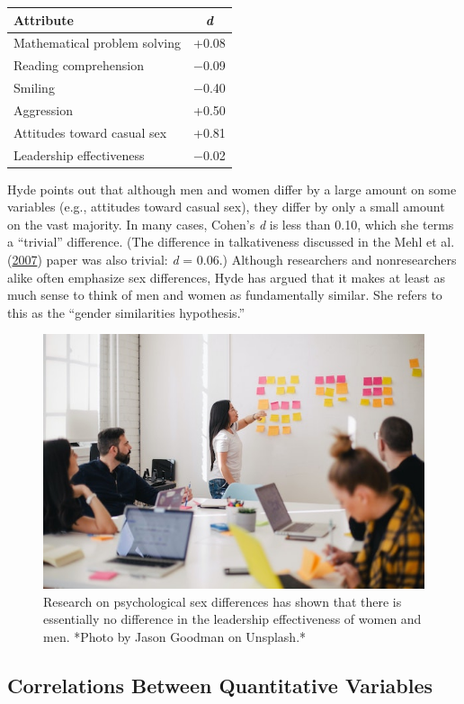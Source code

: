 \documentclass[
]{krantz}
\begin{document}
\begin{longtable}[]{@{}lc@{}}
\toprule()
Attribute & \emph{d} \\
\midrule()
\endhead
Mathematical problem solving & +0.08 \\
Reading comprehension & −0.09 \\
Smiling & −0.40 \\
Aggression & +0.50 \\
Attitudes toward casual sex & +0.81 \\
Leadership effectiveness & −0.02 \\
\bottomrule()
\end{longtable}

Hyde points out that although men and women differ by a large amount on some variables (e.g., attitudes toward casual sex), they differ by only a small amount on the vast majority. In many cases, Cohen's \emph{d} is less than 0.10, which she terms a ``trivial'' difference. (The difference in talkativeness discussed in the Mehl et al. (\protect\hyperlink{ref-mehl2007women}{2007}) paper was also trivial: \emph{d} = 0.06.) Although researchers and nonresearchers alike often emphasize sex differences, Hyde has argued that it makes at least as much sense to think of men and women as fundamentally similar. She refers to this as the ``gender similarities hypothesis.''

\begin{figure}

{\centering \includegraphics[width=0.6\linewidth]{images/ch12/leader} 

}

\caption{Research on psychological sex differences has shown that there is essentially no difference in the leadership effectiveness of women and men. *Photo by Jason Goodman on Unsplash.*}\label{fig:leader}
\end{figure}

\hypertarget{correlations-between-quantitative-variables-1}{%
\subsection*{Correlations Between Quantitative Variables}\label{correlations-between-quantitative-variables-1}}
\end{document}

